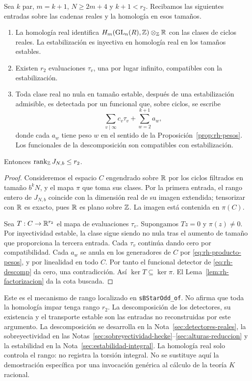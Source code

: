 \begin{proposicion}
\label{prop:rh-rango}
Sea $k$ par, $m=k+1$, $N\ge2m+4$ y $k+1<r_2$. Recibamos las siguientes entradas sobre las cadenas reales y la homología en esos tamaños.
\begin{enumerate}
\item La homología real identifica $H_m(\operatorname{GL}_n(R),\mathbb{Z})\otimes_{\mathbb{Z}}\mathbb{R}$ con las clases de ciclos reales. La estabilización es inyectiva en homología real en los tamaños estables.
\item Existen $r_2$ evaluaciones $\tau_v$, una por lugar infinito, compatibles con la estabilización.
\item Toda clase real no nula en tamaño estable, después de una estabilización admisible, es detectada por un funcional que, sobre ciclos, se escribe
\begin{equation}
 \sum_{v\mid\infty}c_v\tau_v +\sum_{w=2}^{k+1} a_w,
 \label{eq:rh-descomp}
\end{equation}
 donde cada $a_w$ tiene peso $w$ en el sentido de la Proposición~\ref{prop:rh-pesos}. Los funcionales de la descomposición son compatibles con estabilización.
\end{enumerate}
Entonces $\operatorname{rank}_{\mathbb{Z}}J_{N,b}\le r_2$.
\end{proposicion}
\begin{proof}
Consideremos el espacio $C$ engendrado sobre $\mathbb{R}$ por los ciclos filtrados en tamaño $b^kN$, y el mapa $\pi$ que toma sus clases. Por la primera entrada, el rango entero de $J_{N,b}$ coincide con la dimensión real de su imagen extendida; tensorizar con $\mathbb{R}$ es exacto, pues $\mathbb{R}$ es plano sobre $\mathbb{Z}$. La imagen está contenida en $\pi(C)$.

Sea $T:C\to\mathbb{R}^{r_2}$ el mapa de evaluaciones $\tau_v$. Supongamos $Tz=0$ y $\pi(z)\ne0$. Por inyectividad estable, la clase sigue siendo no nula tras el aumento de tamaño que proporciona la tercera entrada. Cada $\tau_v$ continúa dando cero por compatibilidad. Cada $a_w$ se anula en los generadores de $C$ por \eqref{eq:rh-producto-pesos}, y por linealidad en todo $C$. Por tanto el funcional detector de \eqref{eq:rh-descomp} da cero, una contradicción. Así $\ker T\subseteq\ker\pi$. El Lema~\ref{lem:rh-factorizacion} da la cota buscada.
\end{proof}

Este es el mecanismo de rango localizado en \texttt{sBStarOdd\_of}. No afirma que toda la homología impar tenga rango $r_2$. La descomposición de los detectores, su existencia y el transporte estable son las entradas no reconstruidas por este argumento. La descomposición se desarrolla en la Nota~\ref{sec:detectores-reales}, la sobreyectividad en las Notas~\ref{sec:sobreyectividad-hecke}--\ref{sec:alturas-reduccion} y la estabilidad en la Nota~\ref{sec:estabilidad-integral}. La homología real solo controla el rango: no registra la torsión integral. No se sustituye aquí la demostración específica por una invocación genérica al cálculo de la teoría $K$ racional.

